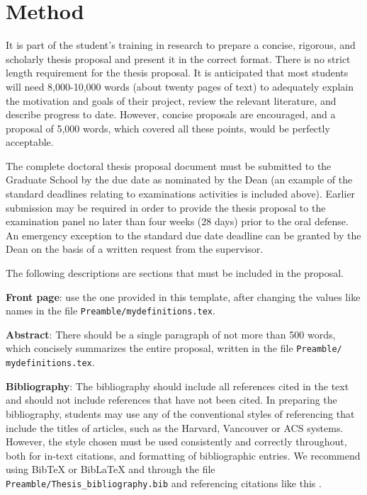 
\chapter{Method} \label{ch-4}

It is part of the student's training in research to prepare a concise, rigorous, and scholarly thesis proposal and present it in the correct format. There is no strict length requirement for the thesis proposal. It is anticipated that most students will need 8,000-10,000 words (about twenty pages of text) to adequately explain the motivation and goals of their project, review the relevant literature, and describe progress to date. However, concise proposals are encouraged, and a proposal of 5,000 words, which covered all these points, would be perfectly acceptable. 

The complete doctoral thesis proposal document must be submitted to the Graduate School by the due date as nominated by the Dean (an example of the standard deadlines relating to examinations activities is included above). Earlier submission may be required in order to provide the thesis proposal to the examination panel no later than four weeks (28 days) prior to the oral defense. An emergency exception to the standard due date deadline can be granted by the Dean on the basis of a written request from the supervisor.

The following descriptions are sections that must be included in the proposal.

\textbf{Front page}: use the one provided in this template, after changing the values like names in the file \texttt{Preamble/mydefinitions.tex}.

\textbf{Abstract}: There should be a single paragraph of not more than 500 words, which concisely summarizes the entire proposal, written in the file \texttt{Preamble/ mydefinitions.tex}.

\textbf{Bibliography}: The bibliography should include all references cited in the text and should not include references that have not been cited. In preparing the bibliography, students may use any of the conventional styles of referencing that include the titles of articles, such as the Harvard, Vancouver or ACS systems. However, the style chosen must be used consistently and correctly throughout, both for in-text citations, and formatting of bibliographic entries. We recommend using BibTeX or BibLaTeX and through the file \texttt{Preamble/Thesis\_bibliography.bib} and referencing citations like this \cite{Lee98, Muc10, Kra27}. 


